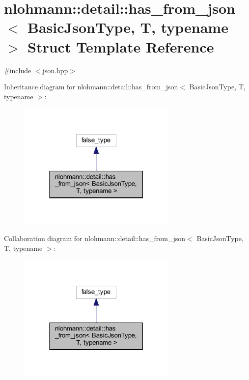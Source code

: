 \hypertarget{structnlohmann_1_1detail_1_1has__from__json}{}\section{nlohmann\+::detail\+::has\+\_\+from\+\_\+json$<$ Basic\+Json\+Type, T, typename $>$ Struct Template Reference}
\label{structnlohmann_1_1detail_1_1has__from__json}


{\ttfamily \#include $<$json.\+hpp$>$}



Inheritance diagram for nlohmann\+::detail\+::has\+\_\+from\+\_\+json$<$ Basic\+Json\+Type, T, typename $>$\+:
\nopagebreak
\begin{figure}[H]
\begin{center}
\leavevmode
\includegraphics[width=222pt]{structnlohmann_1_1detail_1_1has__from__json__inherit__graph}
\end{center}
\end{figure}


Collaboration diagram for nlohmann\+::detail\+::has\+\_\+from\+\_\+json$<$ Basic\+Json\+Type, T, typename $>$\+:
\nopagebreak
\begin{figure}[H]
\begin{center}
\leavevmode
\includegraphics[width=222pt]{structnlohmann_1_1detail_1_1has__from__json__coll__graph}
\end{center}
\end{figure}


